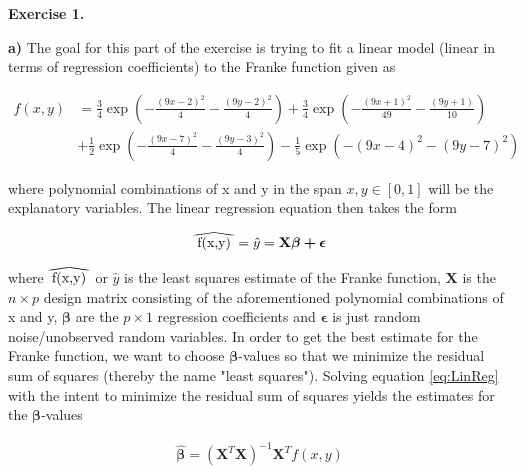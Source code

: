 \documentclass[12pt,a4paper]{article}
\newcommand\reallywidehat[1]{%
\savestack{\tmpbox}{\stretchto{%
  \scaleto{%
    \scalerel*[\widthof{\ensuremath{#1}}]{\kern-.6pt\bigwedge\kern-.6pt}%
    {\rule[-\textheight/2]{1ex}{\textheight}}%
  }{\textheight}%
}{0.5ex}}%
\stackon[1pt]{#1}{\tmpbox}%
}
\begin{document}
\newpage

\begin{center}
\Large{\textbf{Exercise 1.}}
\end{center}

\noindent \textbf{a)} The goal for this part of the exercise is trying to fit a linear model (linear in terms of regression coefficients) to the Franke function given as

\begin{equation}\label{eq:Franke}
\begin{aligned}
f(x,y) &= \frac{3}{4}\exp{\left(-\frac{(9x-2)^2}{4} - \frac{(9y-2)^2}{4}\right)}+\frac{3}{4}\exp{\left(-\frac{(9x+1)^2}{49}- \frac{(9y+1)}{10}\right)} \\
&+\frac{1}{2}\exp{\left(-\frac{(9x-7)^2}{4} - \frac{(9y-3)^2}{4}\right)} -\frac{1}{5}\exp{\left(-(9x-4)^2 - (9y-7)^2\right) }
\end{aligned}
\end{equation}

\noindent where polynomial combinations of x and y in the span $x,y \in [0,1]$ will be the explanatory variables. The linear regression equation then takes the form

\begin{equation}\label{eq:LinReg}
\begin{aligned}
\reallywidehat{f(x,y)} = \hat{y} = \textbf{X} \boldsymbol{\beta + \epsilon}
\end{aligned}
\end{equation}

\noindent where $\reallywidehat{f(x,y)}$ or $\hat{y}$ is the least squares estimate of the Franke function, $\textbf{X}$ is the $n\times p$ design matrix consisting of the aforementioned polynomial combinations of x and y, $\boldsymbol{\beta}$ are the $p\times 1$ regression coefficients and $\boldsymbol{\epsilon}$ is just random noise/unobserved random variables. In order to get the best estimate for the Franke function, we want to choose $\boldsymbol{\beta}$-values so that we minimize the residual sum of squares (thereby the name "least squares"). Solving equation \ref{eq:LinReg} with the intent to minimize the residual sum of squares yields the estimates for the $\boldsymbol{\beta}$-values 

\begin{equation}\label{eq:minBeta}
\begin{aligned}
\hat{\boldsymbol{\beta}} = (\textbf{X}^T\textbf{X})^{-1}\textbf{X}^T f(x,y)
\end{aligned}
\end{equation}
\end{document}
